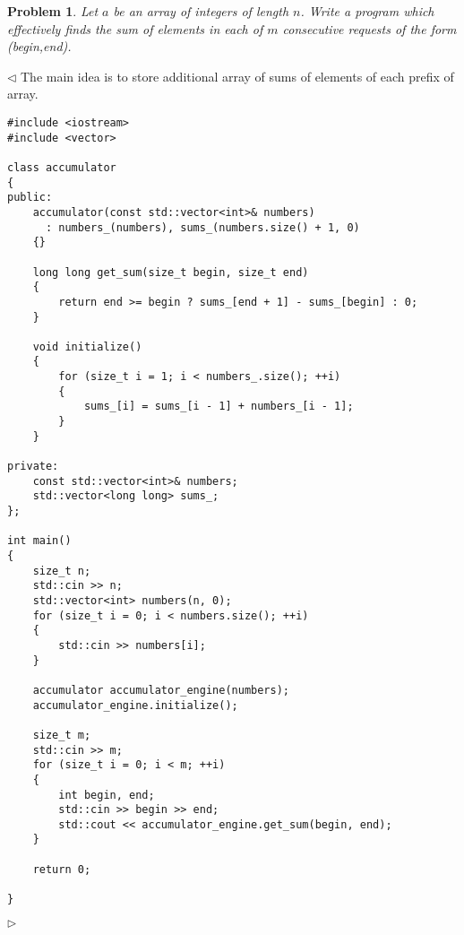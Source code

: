 \documentclass[12pt]{article}
\newtheorem{problem}{Problem}[subsection]
\newenvironment{solution}{\par $\triangleleft$}{$\triangleright$}
\begin{document}
\begin{problem} Let $a$ be an array of integers of length $n$. Write a program which effectively finds the sum of elements in each of $m$ consecutive requests of the form (begin,end).
\end{problem}
\begin{solution} The main idea is to store additional array of sums of elements of each prefix of array.
\begin{verbatim}
#include <iostream>
#include <vector>
 
class accumulator
{
public:
    accumulator(const std::vector<int>& numbers) 
      : numbers_(numbers), sums_(numbers.size() + 1, 0)
    {}
    
    long long get_sum(size_t begin, size_t end)
    {
        return end >= begin ? sums_[end + 1] - sums_[begin] : 0;
    }
    
    void initialize()
    {
        for (size_t i = 1; i < numbers_.size(); ++i)
        {
            sums_[i] = sums_[i - 1] + numbers_[i - 1];
        }
    }
    
private:
    const std::vector<int>& numbers;
    std::vector<long long> sums_;
};
 
int main()
{
    size_t n;
    std::cin >> n;
    std::vector<int> numbers(n, 0);
    for (size_t i = 0; i < numbers.size(); ++i)
    {
        std::cin >> numbers[i];
    }
    
    accumulator accumulator_engine(numbers);
    accumulator_engine.initialize();
    
    size_t m;
    std::cin >> m;
    for (size_t i = 0; i < m; ++i)
    {
        int begin, end;
        std::cin >> begin >> end;
        std::cout << accumulator_engine.get_sum(begin, end);
    }
    
    return 0;
    
}
\end{verbatim}
\end{solution}
 
\end{document}
